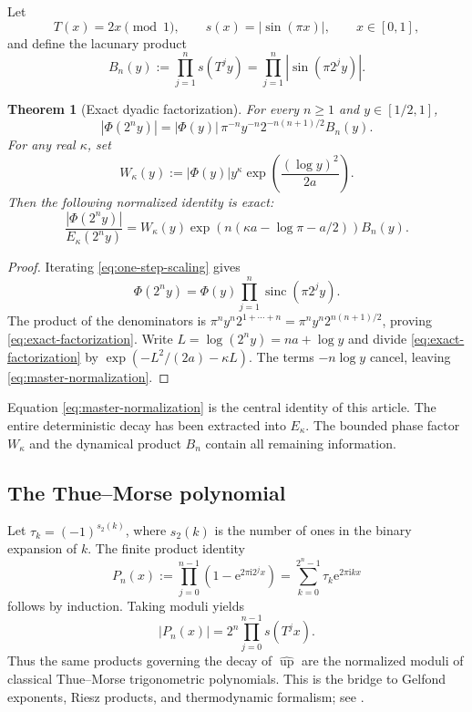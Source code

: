 \documentclass[11pt,oneside]{article}
\newtheorem{theorem}{Theorem}[section]
\theoremstyle{definition}
\theoremstyle{remark}
\newcommand{\e}{\mathrm e}
\newcommand{\ii}{\mathrm i}
\newcommand{\Up}{\operatorname{up}}
\newcommand{\sinc}{\operatorname{sinc}}
\newcommand{\Phiup}{\Phi}
\newcommand{\abs}[1]{\left|#1\right|}
\begin{document}
Let
\[
 T(x)=2x\pmod1,
 \qquad
 s(x)=\abs{\sin(\pi x)},
 \qquad x\in[0,1],
\]
and define the lacunary product
\begin{equation}
 B_n(y):=\prod_{j=1}^{n}s(T^j y)
 =\prod_{j=1}^{n}\abs{\sin(\pi2^j y)}.
 \label{eq:Bny}
\end{equation}

\begin{theorem}[Exact dyadic factorization]
\label{thm:exact-dyadic-factorization}
For every $n\ge1$ and $y\in[1/2,1]$,
\begin{equation}
 \abs{\Phiup(2^n y)}
 =\abs{\Phiup(y)}\,\pi^{-n}y^{-n}2^{-n(n+1)/2}B_n(y).
 \label{eq:exact-factorization}
\end{equation}
For any real $\kappa$, set
\begin{equation}
 W_\kappa(y)
 :=\abs{\Phiup(y)}y^\kappa
   \exp\!\left(\frac{(\log y)^2}{2a}\right).
 \label{eq:W-kappa}
\end{equation}
Then the following normalized identity is exact:
\begin{equation}
 \frac{\abs{\Phiup(2^n y)}}{E_\kappa(2^n y)}
 =W_\kappa(y)
  \exp\!\left(n(\kappa a-\log\pi-a/2)\right)B_n(y).
 \label{eq:master-normalization}
\end{equation}
\end{theorem}

\begin{proof}
Iterating \eqref{eq:one-step-scaling} gives
\[
 \Phiup(2^n y)=\Phiup(y)\prod_{j=1}^{n}\sinc(\pi2^j y).
\]
The product of the denominators is
$\pi^ny^n2^{1+\cdots+n}=\pi^ny^n2^{n(n+1)/2}$, proving
\eqref{eq:exact-factorization}.  Write $L=\log(2^ny)=na+\log y$ and divide
\eqref{eq:exact-factorization} by
$\exp(-L^2/(2a)-\kappa L)$.  The terms $-n\log y$ cancel, leaving
\eqref{eq:master-normalization}.
\end{proof}

Equation \eqref{eq:master-normalization} is the central identity of this article.  The
entire deterministic decay has been extracted into $E_\kappa$.  The bounded phase factor
$W_\kappa$ and the dynamical product $B_n$ contain all remaining information.

\subsection{The Thue--Morse polynomial}

Let $\tau_k=(-1)^{s_2(k)}$, where $s_2(k)$ is the number of ones in the binary expansion of
$k$.  The finite product identity
\begin{equation}
 P_n(x):=\prod_{j=0}^{n-1}(1-\e^{2\pi\ii2^jx})
 =\sum_{k=0}^{2^n-1}\tau_k\e^{2\pi\ii kx}
 \label{eq:TM-polynomial}
\end{equation}
follows by induction.  Taking moduli yields
\begin{equation}
 \abs{P_n(x)}=2^n\prod_{j=0}^{n-1}s(T^jx).
 \label{eq:TM-modulus}
\end{equation}
Thus the same products governing the decay of $\widehat{\Up}$ are the normalized moduli of
classical Thue--Morse trigonometric polynomials.  This is the bridge to Gelfond exponents,
Riesz products, and thermodynamic formalism; see \cite{gelfond,queffelec,fan-schmeling-shen}.
\end{document}
